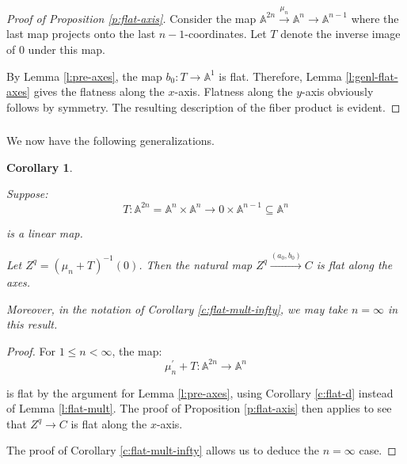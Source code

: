 \documentclass[reqno,11pt]{amsart}
\numberwithin{equation}{subsection}
\newtheorem{cor}[thm]{Corollary}
\theoremstyle{remark}
\newcommand{\xar}[1]{\xrightarrow{#1}}
\newcommand{\bA}{{\mathbb A}}
\renewcommand{\subset}{\subseteq}
\begin{document}
\begin{proof}[Proof of Proposition \ref{p:flat-axis}]

Consider the map $\bA^{2n} \xar{\mu_n} \bA^n \to \bA^{n-1}$ where
the last map projects onto the last $n-1$-coordinates.
Let $T$ denote the inverse image of $0$ under this map.

By Lemma \ref{l:pre-axes}, the map $b_0:T \to \bA^1$ is flat.
Therefore, Lemma \ref{l:genl-flat-axes} gives the flatness along
the $x$-axis. Flatness along the $y$-axis obviously
follows by symmetry. 
The resulting description of the fiber product is 
evident. 

\end{proof}

\subsubsection{}

We now have the following generalizations.

\begin{cor}\label{c:flat-axis-d}

Suppose:
%
\[
T:\bA^{2n} = \bA^{n} \times \bA^{n} \to 0 \times \bA^{n-1} \subset \bA^n
\]

\noindent is a linear map.

Let $Z^q = (\mu_n+T)^{-1}(0)$. Then the natural map 
$Z^q \xar{(a_0,b_0)} C$ is flat along the axes.

Moreover, in the notation of Corollary \ref{c:flat-mult-infty}, we may take 
$n = \infty$ in this result.

\end{cor}

\begin{proof}

For $1\leq n<\infty$, the map:
%
\[
\mu_n^{\prime}+T:\bA^{2n} \to \bA^n
\]

\noindent is flat by the argument for Lemma \ref{l:pre-axes},
using Corollary \ref{c:flat-d} instead of Lemma \ref{l:flat-mult}.
The proof of Proposition \ref{p:flat-axis} then applies to see that
$Z^q \to C$ is flat along the $x$-axis.

The proof of Corollary \ref{c:flat-mult-infty} allows us to deduce the
$n = \infty$ case.

\end{proof}

\subsubsection{}
\end{document}
